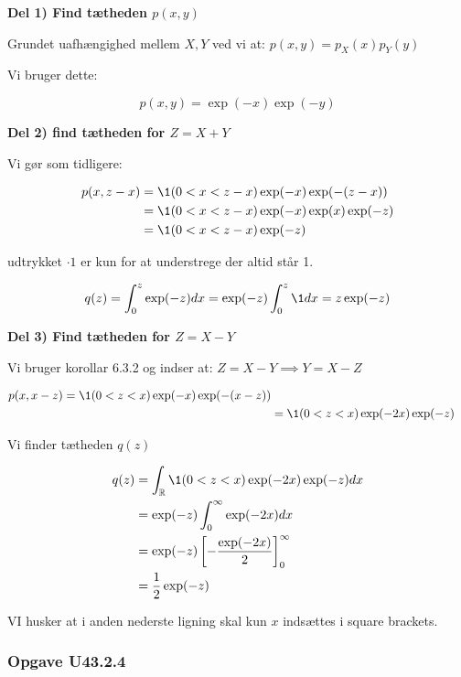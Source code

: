 \textbf{Del 1) Find tætheden $p(x,y)$}

Grundet uafhængighed mellem $X,Y$ ved vi at: $p(x,y) = p_X(x)p_Y(y)$

Vi bruger dette:

\begin{equation}
    p(x,y) = \exp(-x)\exp(-y)
\end{equation}

\textbf{Del 2) find tætheden for $Z = X + Y$}

Vi gør som tidligere:

\begin{align}
     p(x, z-x) &= \1(0< x < z-x) \exp(-x)\exp(- (z-x))  \\ &=
     \1(0< x < z-x)\exp(-x) \exp(x) \exp(-z) \\
     &= \1(0< x < z-x)\exp(-z) 
\end{align}
   

udtrykket $\cdot 1$ er kun for at understrege der altid står 1.

\begin{equation}
    q(z) = \int_{0}^{z}\exp(-z) dx = \exp(-z) \int_{0}^{z} \1 dx = z\exp(-z)
\end{equation}

\textbf{Del 3) Find tætheden for $Z= X - Y$}

Vi bruger korollar 6.3.2 og indser at:
$Z = X - Y \implies Y = X - Z$

\begin{align}
    p(x,x-z) = \1(0 < z < x) \exp(-x) \exp( - (x - z)) \\
    &= \1(0 < z < x) \exp(-2x)\exp(-z)
\end{align}

Vi finder tætheden $q(z)$

\begin{align}
    q(z) &= \int_\R  \1(0 < z < x) \exp(-2x) \exp(-z) dx \\
    &= \exp(-z) \int_{0}^{\infty} \exp(-2x) dx \\
    &= \exp(-z)  \lsp-\frac{\exp(-2x)}{2}\rsp_{0}^{\infty} \\
    &= \frac{1}{2} \exp(-z) 
\end{align}

VI husker at i anden nederste ligning skal kun $x$ indsættes i square brackets.

\subsubsection{Opgave U43.2.4}

